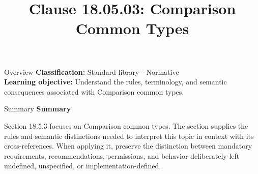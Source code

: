 \documentclass[10pt,letterpaper]{article}
\title{Clause 18.05.03: Comparison Common Types}
\author{}
\date{}
\begin{document}
\maketitle
\begin{CornellOverviewBox}{Overview}
\textbf{Classification:} Standard library - Normative\\[2pt]
\textbf{Learning objective:} Understand the rules, terminology, and semantic consequences associated with Comparison common types.
\end{CornellOverviewBox}\begin{CornellSummaryBox}{Summary}
{\sffamily\bfseries\color{Accent} Summary}\par\vspace{3pt}Section 18.5.3 focuses on Comparison common types. The section supplies the rules and semantic distinctions needed to interpret this topic in context with its cross-references. When applying it, preserve the distinction between mandatory requirements, recommendations, permissions, and behavior deliberately left undefined, unspecified, or implementation-defined.
\end{CornellSummaryBox}
\end{document}
